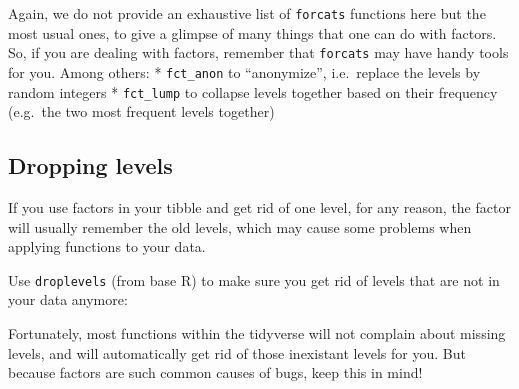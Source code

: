 \documentclass[]{book}
\newenvironment{Shaded}{}{}
\newcommand{\CommentTok}[1]{\textcolor[rgb]{0.38,0.63,0.69}{\textit{#1}}}
\newcommand{\KeywordTok}[1]{\textcolor[rgb]{0.00,0.44,0.13}{\textbf{#1}}}
\newcommand{\NormalTok}[1]{#1}
\newcommand{\OperatorTok}[1]{\textcolor[rgb]{0.40,0.40,0.40}{#1}}
\newcommand{\StringTok}[1]{\textcolor[rgb]{0.25,0.44,0.63}{#1}}
\begin{document}
Again, we do not provide an exhaustive list of \texttt{forcats} functions here but the most usual ones, to give a glimpse of many things that one can do with factors. So, if you are dealing with factors, remember that \texttt{forcats} may have handy tools for you. Among others:
* \texttt{fct\_anon} to ``anonymize'', i.e.~replace the levels by random integers
* \texttt{fct\_lump} to collapse levels together based on their frequency (e.g.~the two most frequent levels together)

\hypertarget{dropping-levels}{%
\subsection{Dropping levels}\label{dropping-levels}}

If you use factors in your tibble and get rid of one level, for any reason, the factor will usually remember the old levels, which may cause some problems when applying functions to your data.

\begin{Shaded}
\end{Shaded}

Use \texttt{droplevels} (from base R) to make sure you get rid of levels that are not in your data anymore:

\begin{Shaded}
\end{Shaded}

Fortunately, most functions within the tidyverse will not complain about missing levels, and will automatically get rid of those inexistant levels for you. But because factors are such common causes of bugs, keep this in mind!
\end{document}
